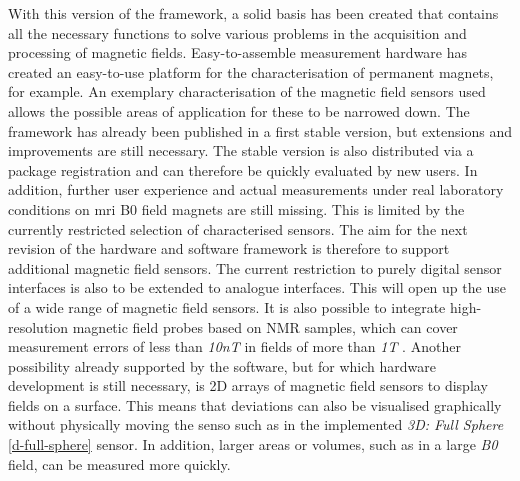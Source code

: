 With this version of the framework, a solid basis has been created that
contains all the necessary functions to solve various problems in the
acquisition and processing of magnetic fields. Easy-to-assemble
measurement hardware has created an easy-to-use platform for the
characterisation of permanent magnets, for example. An exemplary
characterisation of the magnetic field sensors used allows the possible
areas of application for these to be narrowed down. The framework has
already been published in a first stable version, but extensions and
improvements are still necessary. The stable version is also distributed
via a package registration and can therefore be quickly evaluated by new
users. In addition, further user experience and actual measurements
under real laboratory conditions on \gls{mri} B0 field magnets are still
missing. This is limited by the currently restricted selection of
characterised sensors. The aim for the next revision of the hardware and
software framework is therefore to support additional magnetic field
sensors. The current restriction to purely digital sensor interfaces is
also to be extended to analogue interfaces. This will open up the use of
a wide range of magnetic field sensors. It is also possible to integrate
high-resolution magnetic field probes based on NMR samples, which can
cover measurement errors of less than \emph{10nT} in fields of more than
\emph{1T} . Another possibility already supported by the
software, but for which hardware development is still necessary, is 2D
arrays of magnetic field sensors to display fields on a
surface. This means that deviations can also be
visualised graphically without physically moving the senso such as in
the implemented \emph{3D: Full Sphere} \ref{d-full-sphere} sensor. In
addition, larger areas or volumes, such as in a large \emph{B0} field,
can be measured more quickly.

